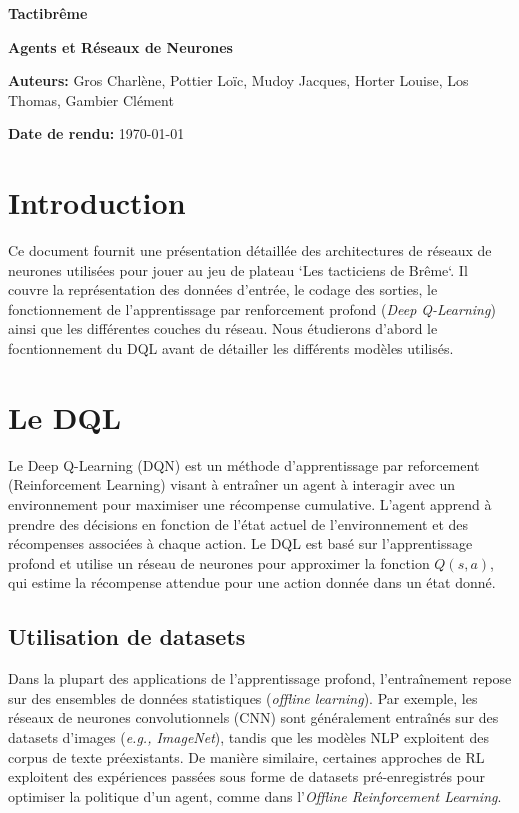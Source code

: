\documentclass[]{article}
\begin{document}
\begin{titlepage}
  \centering

  \vspace*{4cm}

  \Huge
  \textbf{Tactibrême}

  \vspace{1cm}

  \huge
  \textbf{Agents et Réseaux de Neurones}

  \vfill

  \Large
  \textbf{Auteurs:} Gros Charlène, Pottier Loïc, Mudoy Jacques, Horter Louise, Los Thomas, Gambier Clément

  \vspace{1cm}

  \textbf{Date de rendu:} \today
  
\end{titlepage}

\tableofcontents

\newpage

\section{Introduction}
Ce document fournit une présentation détaillée des architectures de réseaux de neurones utilisées pour jouer au jeu de plateau `Les tacticiens de Brême`. Il couvre la représentation des données d'entrée, le codage des sorties, le fonctionnement de l'apprentissage par renforcement profond (\textit{Deep Q-Learning}) ainsi que les différentes couches du réseau.
Nous étudierons d'abord le focntionnement du DQL avant de détailler les différents modèles utilisés.

\section{Le DQL}
Le Deep Q-Learning (DQN) est un méthode d'apprentissage par reforcement (Reinforcement Learning) visant à entraîner un agent à interagir avec un environnement pour maximiser une récompense cumulative. L'agent apprend à prendre des décisions en fonction de l'état actuel de l'environnement et des récompenses associées à chaque action. Le DQL est basé sur l'apprentissage profond et utilise un réseau de neurones pour approximer la fonction \(Q(s, a)\), qui estime la récompense attendue pour une action donnée dans un état donné.

\subsection{Utilisation de datasets}
Dans la plupart des applications de l'apprentissage profond, l'entraînement repose sur des ensembles de données statistiques (\textit{offline learning}). Par exemple, les réseaux de neurones convolutionnels (CNN) sont généralement entraînés sur des datasets d'images (\textit{e.g., ImageNet}), tandis que les modèles NLP exploitent des corpus de texte préexistants. De manière similaire, certaines approches de RL exploitent des expériences passées sous forme de datasets pré-enregistrés pour optimiser la politique d'un agent, comme dans l'\textit{Offline Reinforcement Learning}.
\end{document}
